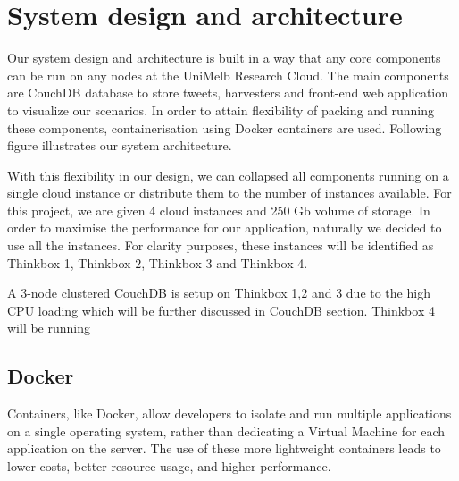 \section{System design and architecture}



Our system design and architecture is built in a way that any core components can be run on any nodes at the UniMelb Research Cloud. The main components are CouchDB database to store tweets, harvesters and front-end web application to visualize our scenarios. In order to attain flexibility of packing and running these components, containerisation using Docker containers are used. Following figure illustrates our system architecture. 





With this flexibility in our design, we can collapsed all components running on a single cloud instance or distribute them to the number of instances available. For this project, we are given 4 cloud instances and 250 Gb volume of storage. In order to maximise the performance for our application, naturally we decided to use all the instances. For clarity purposes, these instances will be identified as Thinkbox 1, Thinkbox 2, Thinkbox 3 and Thinkbox 4. 

A 3-node clustered CouchDB is setup on Thinkbox 1,2 and 3 due to the high CPU loading which will be further discussed in CouchDB section. Thinkbox 4 will be running 











 
\subsection{Docker}
Containers, like Docker, allow developers to isolate and run multiple applications on a single operating system, rather than dedicating a Virtual Machine for each application on the server. The use of these more lightweight containers leads to lower costs, better resource usage, and higher performance.
